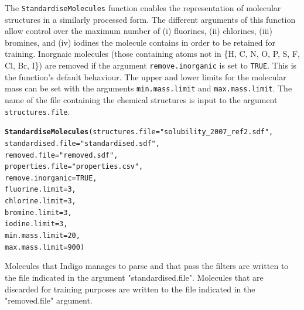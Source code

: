 \documentclass[twoside,a4wide,12pt]{article}\usepackage[]{graphicx}\usepackage[]{color}
\makeatletter
\newcommand{\hlnum}[1]{\textcolor[rgb]{0.686,0.059,0.569}{#1}}%
\newcommand{\hlstr}[1]{\textcolor[rgb]{0.192,0.494,0.8}{#1}}%
\newcommand{\hlstd}[1]{\textcolor[rgb]{0.345,0.345,0.345}{#1}}%
\newcommand{\hlkwc}[1]{\textcolor[rgb]{0.333,0.667,0.333}{#1}}%
\newcommand{\hlkwd}[1]{\textcolor[rgb]{0.737,0.353,0.396}{\textbf{#1}}}%
\newenvironment{kframe}{%
 \def\at@end@of@kframe{}%
 \ifinner\ifhmode%
  \def\at@end@of@kframe{\end{minipage}}%
  \begin{minipage}{\columnwidth}%
 \fi\fi%
 \def\FrameCommand##1{\hskip\@totalleftmargin \hskip-\fboxsep
 \colorbox{shadecolor}{##1}\hskip-\fboxsep
     \hskip-\linewidth \hskip-\@totalleftmargin \hskip\columnwidth}%
 \MakeFramed {\advance\hsize-\width
   \@totalleftmargin\z@ \linewidth\hsize
   \@setminipage}}%
 {\par\unskip\endMakeFramed%
 \at@end@of@kframe}
\newenvironment{knitrout}{}{} %
\makeatother
\begin{document}
The \texttt{StandardiseMolecules} function enables the representation of molecular structures in a similarly processed form.
The different arguments of this function allow control over the maximum number of (i) fluorines, (ii) chlorines,
(iii) bromines, and (iv) iodines the molecule contains in order to be retained for training.
Inorgnaic molecules (those containing atoms not in \{H, C, N, O, P, S, F, Cl, Br, I\}) are removed if the argument \texttt{remove.inorganic} is set to \texttt{TRUE}. This is the function's default behaviour.
The upper and lower limits for the molecular mass can be set with the arguments \texttt{min.mass.limit} and \texttt{max.mass.limit}.
The name of the file containing the chemical structures is input to the argument \texttt{structures.file}.
\begin{knitrout}
\color{fgcolor}\begin{kframe}
\begin{alltt}
\hlkwd{StandardiseMolecules}\hlstd{(}\hlkwc{structures.file}\hlstd{=}\hlstr{"solubility_2007_ref2.sdf"}\hlstd{,}
                     \hlkwc{standardised.file}\hlstd{=}\hlstr{"standardised.sdf"}\hlstd{,}
                     \hlkwc{removed.file}\hlstd{=}\hlstr{"removed.sdf"}\hlstd{,}
                     \hlkwc{properties.file} \hlstd{=} \hlstr{"properties.csv"}\hlstd{,}
                     \hlkwc{remove.inorganic}\hlstd{=}\hlnum{TRUE}\hlstd{,}
                     \hlkwc{fluorine.limit}\hlstd{=}\hlnum{3}\hlstd{,}
                     \hlkwc{chlorine.limit}\hlstd{=}\hlnum{3}\hlstd{,}
                     \hlkwc{bromine.limit}\hlstd{=}\hlnum{3}\hlstd{,}
                     \hlkwc{iodine.limit}\hlstd{=}\hlnum{3}\hlstd{,}
                     \hlkwc{min.mass.limit}\hlstd{=}\hlnum{20}\hlstd{,}
                     \hlkwc{max.mass.limit}\hlstd{=}\hlnum{900}\hlstd{)}
\end{alltt}
\end{kframe}
\end{knitrout}
Molecules that Indigo manages to parse and that pass the filters are written to the file indicated in the argument "standardised.file". Molecules that are discarded for training purposes are written to the file indicated in the "removed.file" argument.
\end{document}
